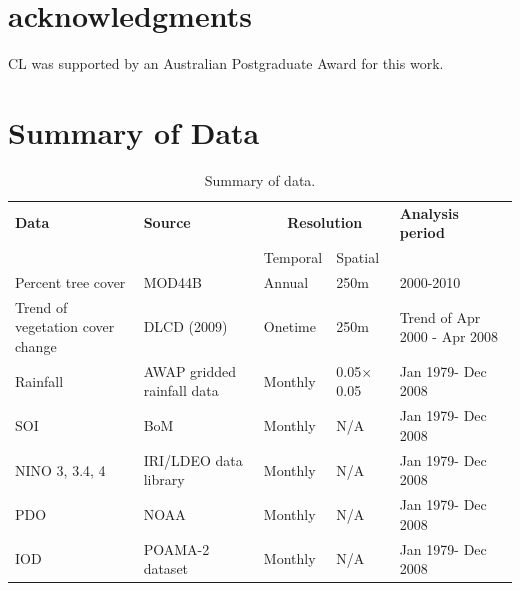 \documentclass[authoryear,preprint,review,12pt]{elsarticle}
\begin{document}
\section{acknowledgments}
CL was supported by an Australian Postgraduate Award for this work.

\appendix

\section{Summary of Data}

 \begin{table}
 \caption{Summary of data.}
  \label{tab:ch3Data}
 \begin{tabular}{lllll}
  \hline
  \textbf{Data} & \textbf{Source} & \multicolumn{2}{c}{\textbf{Resolution}} & \textbf{Analysis period} \\\cline{3-4}
  & & Temporal & Spatial & \\\hline
  Percent tree cover & MOD44B & Annual &	250m & 2000-2010\\
  Trend of vegetation cover change  &	DLCD (2009)	& Onetime & 250m	& Trend of Apr 2000 - Apr 2008\\
  Rainfall &	AWAP gridded rainfall data &	Monthly &	0.05\textdegree$\times$0.05\textdegree & Jan 1979- Dec 2008\\
  SOI	& BoM	& Monthly &	N/A &	Jan 1979- Dec 2008\\
  NINO 3, 3.4, 4 &	IRI/LDEO data library	& Monthly	& N/A	& Jan 1979- Dec 2008\\
  PDO	& NOAA & Monthly	& N/A	& Jan 1979- Dec 2008\\
  IOD	& POAMA-2 dataset	& Monthly	& N/A	& Jan 1979- Dec 2008\\
  \hline
  \end{tabular}
\end{table}

\newpage


%
 

\end{document}
